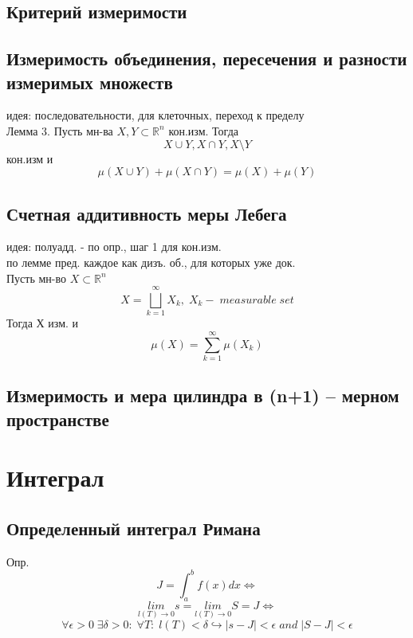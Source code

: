 \documentclass{article}
\begin{document}
\subsection{Критерий измеримости}
\subsection{Измеримость объединения, пересечения и разности измеримых множеств}
идея: последовательности, для клеточных, переход к пределу \\
Лемма 3. Пусть мн-ва $X,Y \subset \mathbb R^n$ кон.изм. Тогда
\begin{equation*}
    X \cup Y, X \cap Y, X \setminus Y
\end{equation*}
кон.изм и
\begin{equation*}
    \mu (X \cup Y) + \mu (X \cap Y) = \mu (X) + \mu (Y)
\end{equation*}
\subsection{Счетная аддитивность меры Лебега}
идея: полуадд. - по опр., шаг 1 для кон.изм.\\
по лемме пред. каждое как дизъ. об., для которых уже док. \\
Пусть мн-во $X \subset \mathbb R^n$
\begin{equation*}
    X = \bigsqcup_{k=1}^{\infty} X_k, \; X_k - \; measurable \; set
\end{equation*}
Тогда Х изм. и
\begin{equation*}
    \mu (X) = \sum_{k=1}^\infty \mu ( X_k )
\end{equation*}
\subsection{Измеримость и мера цилиндра в (n+1) – мерном пространстве}


\section{Интеграл}
\subsection{Определенный интеграл Римана}
Опр.
\begin{equation*}
    J = \int_a^b f(x) dx \Leftrightarrow
\end{equation*}
\begin{equation*}
    \underset{l(T) \rightarrow 0}{lim} s = \underset{l(T) \rightarrow 0}{lim} S = J \Leftrightarrow
\end{equation*}
\begin{equation*}
    \forall \epsilon >0 \; \exists \delta > 0: \; \forall T: \; l(T)<\delta \hookrightarrow |s-J|<\epsilon \; and \; |S-J|<\epsilon
\end{equation*}
\end{document}
